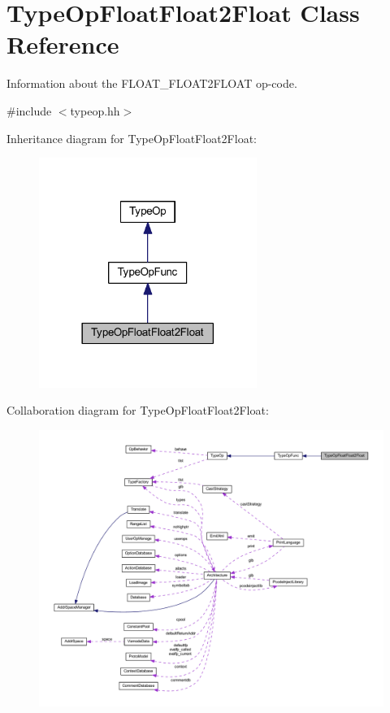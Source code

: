 \hypertarget{class_type_op_float_float2_float}{}\section{Type\+Op\+Float\+Float2\+Float Class Reference}
\label{class_type_op_float_float2_float}


Information about the F\+L\+O\+A\+T\+\_\+\+F\+L\+O\+A\+T2\+F\+L\+O\+AT op-\/code.  




{\ttfamily \#include $<$typeop.\+hh$>$}



Inheritance diagram for Type\+Op\+Float\+Float2\+Float\+:
\nopagebreak
\begin{figure}[H]
\begin{center}
\leavevmode
\includegraphics[width=201pt]{class_type_op_float_float2_float__inherit__graph}
\end{center}
\end{figure}


Collaboration diagram for Type\+Op\+Float\+Float2\+Float\+:
\nopagebreak
\begin{figure}[H]
\begin{center}
\leavevmode
\includegraphics[width=350pt]{class_type_op_float_float2_float__coll__graph}
\end{center}
\end{figure}
